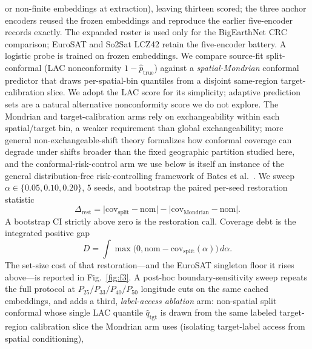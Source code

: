 \documentclass[journal]{IEEEtran}
\renewcommand{\_}{\textunderscore\allowbreak}
\begin{document}
or non-finite embeddings at extraction), leaving thirteen scored; the three anchor encoders reused
the frozen embeddings and reproduce the earlier five-encoder records exactly. The expanded roster is used
only for the BigEarthNet CRC comparison; EuroSAT and So2Sat LCZ42 retain the five-encoder battery.
A logistic probe is trained on frozen embeddings. We compare source-fit
split-conformal \citep{vovk2005algorithmic,angelopoulos2023conformal} (LAC \citep{sadinle2019lac} nonconformity $1-\hat p_{\text{true}}$) against a \emph{spatial-Mondrian} conformal
predictor \citep{vovk2003mondrian} that draws per-spatial-bin quantiles from a disjoint same-region target-calibration slice. We adopt
the LAC score for its simplicity; adaptive prediction sets \citep{romano2020classification} are a natural
alternative nonconformity score we do not explore. The Mondrian and target-calibration arms rely on
exchangeability within each spatial/target bin, a weaker requirement than global exchangeability; more general
non-exchangeable-shift theory \citep{barber2023conformal} formalizes how conformal coverage can degrade under
shifts broader than the fixed geographic partition studied here, and the conformal-risk-control arm we use
below \citep{angelopoulos2024crc} is itself an instance of the general distribution-free risk-controlling
framework of Bates et al.~\citep{bates2021distributionfree}. We sweep
$\alpha\in\{0.05,0.10,0.20\}$, $5$ seeds, and bootstrap the paired per-seed restoration statistic
\begin{equation}
\label{eq:restoration}
\Delta_{\mathrm{rest}}
=\bigl|\mathrm{cov}_{\mathrm{split}}-\mathrm{nom}\bigr|
-\bigl|\mathrm{cov}_{\mathrm{Mondrian}}-\mathrm{nom}\bigr|.
\end{equation}
A bootstrap CI strictly above zero is the restoration call.
Coverage debt is the integrated positive gap
\begin{equation}
\label{eq:debt}
D=\int \max\bigl(0,\mathrm{nom}-\mathrm{cov}_{\mathrm{split}}(\alpha)\bigr)\,d\alpha.
\end{equation}
The set-size cost of that restoration---and the EuroSAT singleton floor it rises above---is reported in
Fig.~\ref{fig:f3}.
A post-hoc boundary-sensitivity sweep repeats the full protocol at $P_{25}/P_{33}/P_{40}/P_{50}$ longitude
cuts on the same cached embeddings, and adds a third, \emph{label-access ablation} arm: non-spatial split
conformal whose single LAC quantile $\hat q_{\mathrm{tgt}}$ is drawn from the same labeled target-region
calibration slice the Mondrian arm uses (isolating target-label access from spatial conditioning),
\end{document}
